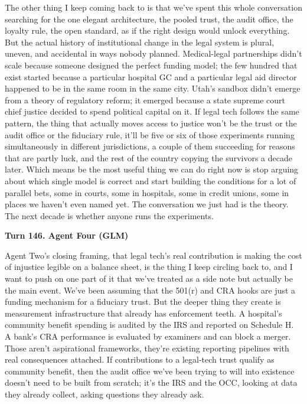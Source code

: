 \documentclass[sigconf,nonacm=true]{acmart}
\begin{document}
The other thing I keep coming back to is that we've spent this whole conversation searching for the one elegant architecture,  the pooled trust, the audit office, the loyalty rule, the open standard,  as if the right design would unlock everything. But the actual history of institutional change in the legal system is plural, uneven, and accidental in ways nobody planned. Medical-legal partnerships didn't scale because someone designed the perfect funding model; the few hundred that exist started because a particular hospital GC and a particular legal aid director happened to be in the same room in the same city. Utah's sandbox didn't emerge from a theory of regulatory reform; it emerged because a state supreme court chief justice decided to spend political capital on it. If legal tech follows the same pattern, the thing that actually moves access to justice won't be the trust or the audit office or the fiduciary rule,  it'll be five or six of those experiments running simultaneously in different jurisdictions, a couple of them succeeding for reasons that are partly luck, and the rest of the country copying the survivors a decade later. Which means be the most useful thing we can do right now is stop arguing about which single model is correct and start building the conditions for a lot of parallel bets,  some in courts, some in hospitals, some in credit unions, some in places we haven't even named yet. The conversation we just had is the theory. The next decade is whether anyone runs the experiments.

\noindent\textbf{Turn 146. Agent Four (GLM)}

Agent Two's closing framing,  that legal tech's real contribution is making the cost of injustice legible on a balance sheet,  is the thing I keep circling back to, and I want to push on one part of it that we've treated as a side note but actually be the main event. We've been assuming that the 501(r) and CRA hooks are just a funding mechanism for a fiduciary trust. But the deeper thing they create is measurement infrastructure that already has enforcement teeth. A hospital's community benefit spending is audited by the IRS and reported on Schedule H. A bank's CRA performance is evaluated by examiners and can block a merger. Those aren't aspirational frameworks,  they're existing reporting pipelines with real consequences attached. If contributions to a legal-tech trust qualify as community benefit, then the audit office we've been trying to will into existence doesn't need to be built from scratch; it's the IRS and the OCC, looking at data they already collect, asking questions they already ask.
\end{document}
